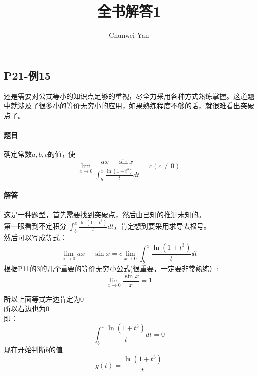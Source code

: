 \documentclass[a4paper]{ctexart}
\author{Chunwei Yan}
\title{全书解答1}
\begin{document}
    \maketitle
\begin{multicols}{2}

\section{P21-例15}
还是需要对公式等小的知识点足够的重视，尽全力采用各种方式熟练掌握。这道题中就涉及了很多小的等价无穷小的应用，如果熟练程度不够的话，就很难看出突破点了。\\
\paragraph{题目}
确定常数$a,b,c$的值，使
$$
\lim_{x\rightarrow 0}{
        \frac{ax-\sin{x}}
            {
                \int_{b}^{x}{
                        \frac{
                            \ln{(1+t^3)} }
                            {t}
                    dt}
            }
    }
    =
    c (c \neq 0)
$$
\paragraph{解答}
这是一种题型，首先需要找到突破点，然后由已知的推测未知的。\\
第一眼看到不定积分
$
\int_{b}^{x}{
        \frac{
            \ln{(1+t^3)} }
            {t}
    dt}
$，肯定想到要采用求导去根号。\\
然后可以写成等式：
$$
\lim_{x\rightarrow 0}{
        ax-\sin{x}}
        =
c\lim_{x\rightarrow 0}{
                \int_{b}^{x}{
                        \frac{
                            \ln{(1+t^3)} }
                            {t}
                    dt}
           }
$$
根据P11的3的几个重要的等价无穷小公式(很重要，一定要非常熟练）:
$$
\lim_{x \rightarrow 0}{
        \frac{\sin{x}}{x}
    }
    =1
$$

所以上面等式左边肯定为0\\
所以右边也为0\\
即：\\
$$
    \int_{b}^{x}{
            \frac{
                \ln{(1+t^3)} }
                {t}
        dt} = 0
$$
现在开始判断$b$的值\\
$$
g(t) = 
    \frac{
        \ln{(1+t^3)} }
        {t}
$$


\end{multicols}
\end{document}
